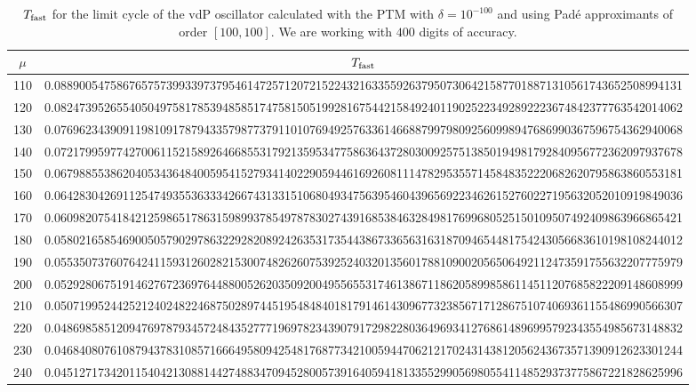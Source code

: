\documentclass[final]{article}
\begin{document}
\begin{table}
\caption{$T_{\rm fast}$  for the limit cycle of the vdP oscillator calculated with the PTM with $\delta=10^{-100}$ and using Pad\'e approximants of order $[100,100]$. We are working with $400$ digits of accuracy. }
\bigskip
\label{table_tfast_vdP2}
\begin{center}
\begin{tabular}{|c|c|}
\hline
$\mu$ &   $T_{\rm fast}$    \\
\hline
110 &   0.08890054758676575739933973795461472571207215224321633559263795073064215877018871310561743652508994131 \\
120 &   0.08247395265540504975817853948585174758150519928167544215849240119025223492892223674842377763542014062 \\
130 &   0.07696234390911981091787943357987737911010769492576336146688799798092560998947686990367596754362940068 \\
140 &   0.07217995977427006115215892646685531792135953477586364372803009257513850194981792840956772362097937678 \\
150 &   0.06798855386204053436484005954152793414022905944616926081114782953557145848352220682620795863860553181 \\
160 &   0.06428304269112547493553633342667431331510680493475639546043965692234626152760227195632052010919849036 \\
170 &   0.06098207541842125986517863159899378549787830274391685384632849817699680525150109507492409863966865421 \\
180 &   0.05802165854690050579029786322928208924263531735443867336563163187094654481754243056683610198108244012 \\
190 &   0.05535073760764241159312602821530074826260753925240320135601788109002056506492112473591755632207775979 \\
200 &   0.05292806751914627672369764488005262035092004955655317461386711862058998586114511207685822209148608999 \\
210 &   0.05071995244252124024822468750289744519548484018179146143096773238567171286751074069361155486990566307 \\
220 &   0.04869858512094769787934572484352777196978234390791729822803649693412768614896995792343554985673148832 \\
230 &   0.04684080761087943783108571666495809425481768773421005944706212170243143812056243673571390912623301244 \\
240 &   0.04512717342011540421308814427488347094528005739164059418133552990569805541148529373775867221828625996 \\

\end{tabular}
\end{center}
\end{table}
\end{document}
